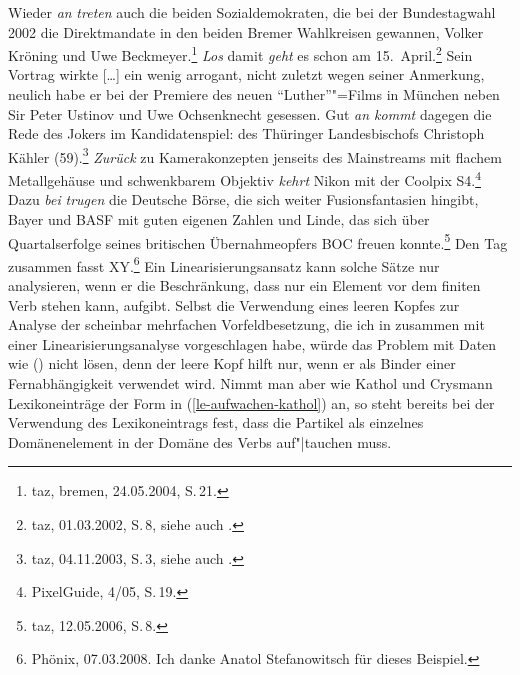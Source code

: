 Wieder \emph{an} \emph{treten} auch die beiden Sozialdemokraten, die bei der Bundestagwahl 2002 die Direktmandate in den beiden Bremer Wahlkreisen gewannen, Volker Kröning und Uwe Beckmeyer.\footnote{
  taz, bremen, 24.05.2004, S.\,21.
}
\ex\label{bsp-los-damit}
\emph{Los} damit \emph{geht} es schon am 15.\ April.\footnote{
        taz, 01.03.2002, S.\,8, siehe auch .
    }
\ex Sein Vortrag wirkte [\ldots] %
ein wenig arrogant, nicht zuletzt wegen seiner Anmerkung,
neulich habe er bei der Premiere des neuen "`Luther"'"=Films in München neben
Sir Peter Ustinov und Uwe Ochsenknecht gesessen. %
Gut \emph{an kommt} dagegen die Rede des Jokers im Kandidatenspiel: des Thüringer Landesbischofs Christoph Kähler (59).\footnote{
        taz, 04.11.2003, S.\,3, siehe auch .%
}
\ex
\emph{Zurück} zu Kamerakonzepten jenseits des Mainstreams mit flachem Metallgehäuse und schwenkbarem Objektiv \emph{kehrt} Nikon mit der
Coolpix S4.\footnote{
  PixelGuide, 4/05, S.\,19.
}
\ex Dazu \emph{bei} \emph{trugen} die Deutsche Börse, die sich weiter Fusionsfantasien hingibt, Bayer und BASF
mit guten eigenen Zahlen und Linde, das sich über Quartalserfolge seines britischen Übernahmeopfers
BOC freuen konnte.\footnote{
  taz, 12.05.2006, S.\,8. 
}
\ex Den Tag zusammen fasst XY.\footnote{
     Phönix, 07.03.2008. Ich danke Anatol Stefanowitsch für dieses
     Beispiel.
}
\zl
Ein Linearisierungsansatz kann solche Sätze nur analysieren, 
wenn er die Beschränkung, dass nur ein Element vor dem finiten Verb stehen kann, aufgibt.
Selbst die Verwendung eines leeren Kopfes zur Analyse der scheinbar mehrfachen Vorfeldbesetzung,
die ich in  zusammen mit einer Linearisierungsanalyse vorgeschlagen habe,
würde das Problem mit Daten wie () nicht lösen, denn der leere Kopf hilft nur,
wenn er als Binder einer Fernabhängigkeit verwendet wird. Nimmt man aber wie Kathol und Crysmann
Lexikoneinträge der Form in (\ref{le-aufwachen-kathol}) an, so steht bereits bei der Verwendung
des Lexikoneintrags fest, dass die Partikel als einzelnes Domänenelement in der Domäne des Verbs auf"|tauchen muss.
